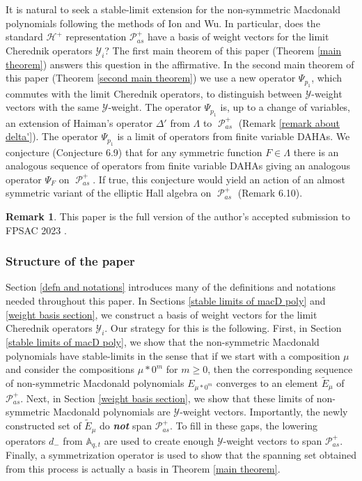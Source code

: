 \documentclass[11pt]{article}
\theoremstyle{definition}
\newtheorem{rema}[theo]{Remark}
\numberwithin{equation}{section}
\newcommand{\y}{{ \mathscr{Y} }}
\DeclareMathOperator{\sP}{\mathscr{P} }
\begin{document}
It is natural to seek a stable-limit extension for the non-symmetric Macdonald polynomials following the methods of Ion and Wu. In particular, does the standard $\mathscr{H}^{+}$ representation $\mathscr{P}_{as}^{+}$ have a basis of weight vectors for the limit Cherednik operators $\y_i$? The first main theorem of this paper (Theorem \ref{main theorem}) answers this question in the affirmative. In the second main theorem of this paper (Theorem \ref{second main theorem}) we use a new operator $\Psi_{p_1}$, which commutes with the limit Cherednik operators, to distinguish between $\y$-weight vectors with the same $\y$-weight. The operator $\Psi_{p_1}$ is, up to a change of variables, an extension of Haiman's operator $\Delta'$ \cite{HMacDG} from $\Lambda$ to $\sP_{as}^{+}$ (Remark \ref{remark about delta'}). The operator $\Psi_{p_1}$ is a limit of operators from finite variable DAHAs. We conjecture (Conjecture 6.9) that for any symmetric function $F \in \Lambda$ there is an analogous sequence of operators from finite variable DAHAs giving an analogous operator $\Psi_{F}$ on $\sP_{as}^{+}.$ If true, this conjecture would yield an action of an almost symmetric variant of the elliptic Hall algebra \cite{BS, SV} on $\sP_{as}^{+}$ (Remark 6.10).

\begin{rema}
This paper is the full version of the author's accepted submission to FPSAC 2023 \cite{MBW}.
\end{rema}

\subsubsection*{Structure of the paper}
Section \ref{defn and notations} introduces many of the definitions and notations needed throughout this paper. In Sections \ref{stable limits of macD poly} and \ref{weight basis section},
we construct a basis of weight vectors for the limit Cherednik operators $\mathscr{Y}_i$.
Our strategy for this is the following. First, in Section \ref{stable limits of macD poly}, we show that the non-symmetric Macdonald polynomials have stable-limits in the sense that if we start with a composition $\mu$ and consider the compositions $\mu * 0^m$ for $m \geq 0$, then the corresponding sequence of non-symmetric Macdonald polynomials $E_{\mu * 0^m}$ converges to an element $\widetilde{E}_{\mu}$ of $\mathscr{P}_{as}^{+}$. Next, in Section \ref{weight basis section}, we show that these limits of non-symmetric Macdonald polynomials are $\mathscr{Y}$-weight vectors. Importantly, the newly constructed set of $\widetilde{E}_{\mu}$ do \textbf{\textit{not}} span $\mathscr{P}_{as}^{+}$. To fill in these gaps, the lowering operators $d_{-}$ from $\mathbb{A}_{q,t}$ are used to create enough $\y$-weight vectors to span $\mathscr{P}_{as}^{+}$. Finally, a symmetrization operator is used to show that the spanning set obtained from this process is actually a basis in Theorem \ref{main theorem}.
\end{document}
